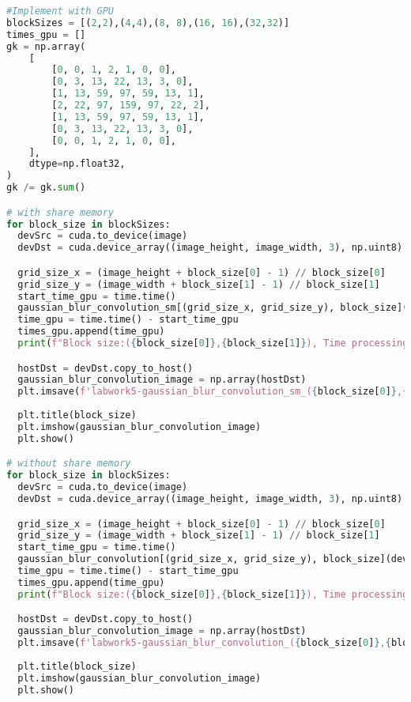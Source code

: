 \documentclass[12pt]{article}
\begin{document}
\begin{lstlisting}[language=Python]
#Implement with GPU
blockSizes = [(2,2),(4,4),(8, 8),(16, 16),(32,32)]
times_gpu = []
gk = np.array(
    [
        [0, 0, 1, 2, 1, 0, 0],
        [0, 3, 13, 22, 13, 3, 0],
        [1, 13, 59, 97, 59, 13, 1],
        [2, 22, 97, 159, 97, 22, 2],
        [1, 13, 59, 97, 59, 13, 1],
        [0, 3, 13, 22, 13, 3, 0],
        [0, 0, 1, 2, 1, 0, 0],
    ],
    dtype=np.float32,
)
gk /= gk.sum()

# with share memory
for block_size in blockSizes:
  devSrc = cuda.to_device(image)
  devDst = cuda.device_array((image_height, image_width, 3), np.uint8)

  grid_size_x = (image_height + block_size[0] - 1) // block_size[0]
  grid_size_y = (image_width + block_size[1] - 1) // block_size[1]
  start_time_gpu = time.time()
  gaussian_blur_convolution_sm[(grid_size_x, grid_size_y), block_size](devSrc, devDst, gk)
  time_gpu = time.time() - start_time_gpu
  times_gpu.append(time_gpu)
  print(f"Block size:({block_size[0]},{block_size[1]}), Time processing on GPU with shared memory: {time_gpu}s")

  hostDst = devDst.copy_to_host()
  gaussian_blur_convolution_image = np.array(hostDst)
  plt.imsave(f'labwork5-gaussian_blur_convolution_sm_({block_size[0]},{block_size[1]}).jpg', gaussian_blur_convolution_image, cmap='gray')
  
  plt.title(block_size)
  plt.imshow(gaussian_blur_convolution_image)
  plt.show()

# without share memory
for block_size in blockSizes:
  devSrc = cuda.to_device(image)
  devDst = cuda.device_array((image_height, image_width, 3), np.uint8)

  grid_size_x = (image_height + block_size[0] - 1) // block_size[0]
  grid_size_y = (image_width + block_size[1] - 1) // block_size[1]
  start_time_gpu = time.time()
  gaussian_blur_convolution[(grid_size_x, grid_size_y), block_size](devSrc, devDst, gk)
  time_gpu = time.time() - start_time_gpu
  times_gpu.append(time_gpu)
  print(f"Block size:({block_size[0]},{block_size[1]}), Time processing on GPU without shared memory: {time_gpu}s")

  hostDst = devDst.copy_to_host()
  gaussian_blur_convolution_image = np.array(hostDst)
  plt.imsave(f'labwork5-gaussian_blur_convolution_({block_size[0]},{block_size[1]}).jpg', gaussian_blur_convolution_image, cmap='gray')
  
  plt.title(block_size)
  plt.imshow(gaussian_blur_convolution_image)
  plt.show()
\end{lstlisting}
\end{document}

